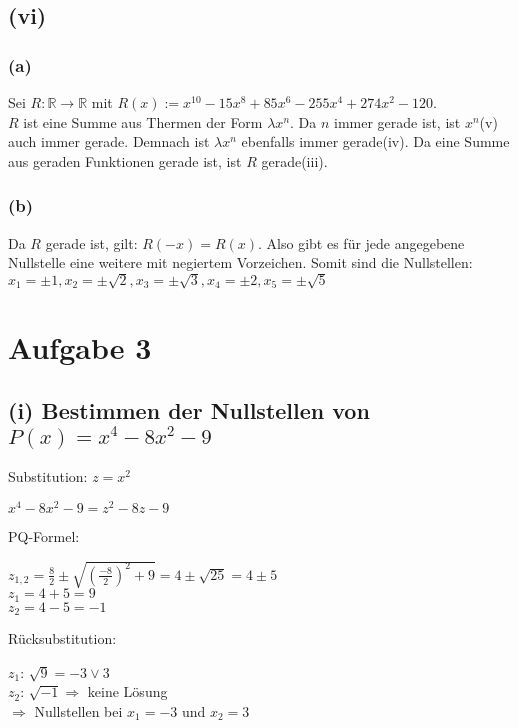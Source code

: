 \documentclass{article}
\begin{document}
\subsection{(vi)}
\subsubsection{(a)}
Sei $R: \mathbb{R} \to \mathbb{R}$ mit $R(x) := x^{10} - 15x^8 + 85x^6 - 255x^4 + 274x^2-120$. \\
$R$ ist eine Summe aus Thermen der Form $\lambda x^n$. Da $n$ immer gerade ist, ist $x^n$(v) auch immer gerade. Demnach ist $\lambda x^n$ ebenfalls immer gerade(iv). Da eine Summe aus geraden Funktionen gerade ist, ist $R$ gerade(iii).
\subsubsection{(b)}
Da $R$ gerade ist, gilt: $R(-x) = R(x)$. Also gibt es für jede angegebene Nullstelle eine weitere mit negiertem Vorzeichen. Somit sind die Nullstellen: $x_1 = \pm 1, x_2 = \pm \sqrt{2}, x_3 = \pm \sqrt{3}, x_4 = \pm 2, x_5 = \pm \sqrt{5}$

\section{Aufgabe 3}
\subsection{(i) Bestimmen der Nullstellen von $P(x)=x^4-8x^2-9$}
Substitution: $z=x^2$ 
\begin{center}
    $x^4-8x^2-9=z^2-8z-9$
\end{center}
PQ-Formel: 
\begin{center}
    $z_{1,2}=\frac{8}{2} \pm \sqrt{(\frac{-8}{2})^2 + 9} = 4 \pm \sqrt{25} = 4 \pm 5$ \\
    $z_1=4+5=9$ \\
    $z_2=4-5=-1$
\end{center}
Rücksubstitution:
\begin{center}
    $z_1$: $\sqrt{9} = -3 \lor 3$ \\
    $z_2$: $\sqrt{-1} \Longrightarrow$ keine Lösung \\
    $\Longrightarrow$ Nullstellen bei $x_1 = -3$ und $x_2 = 3$
\end{center}
\end{document}
